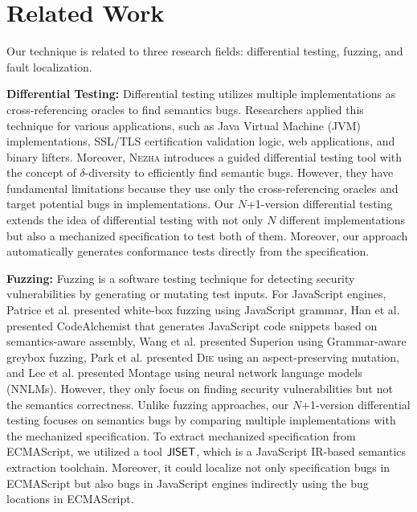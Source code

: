 \section{Related Work}\label{sec:related}

Our technique is related to three research fields: differential testing,
fuzzing, and fault localization.

\textbf{Differential Testing:} Differential testing\cite{diff-test} utilizes
multiple implementations as cross-referencing oracles to find semantics bugs.
Researchers applied this technique for various applications, such as Java
Virtual Machine (JVM) implementations\cite{diff-jvm}, SSL/TLS certification
validation logic\cite{nezha,diff-ssl,diff-ssl2}, web
applications\cite{diff-web}, and binary lifters\cite{ir-diff-test}.  Moreover,
\textsc{Nezha}\cite{nezha} introduces a guided differential testing tool with
the concept of $\delta$-diversity to efficiently find semantic bugs.  However,
they have fundamental limitations because they use only the cross-referencing
oracles and target potential bugs in implementations.  Our $N$+1-version differential
testing extends the idea of differential testing with not only $N$ different
implementations but also a mechanized specification to test both of them.
Moreover, our approach automatically generates conformance tests directly from
the specification.

\textbf{Fuzzing:} Fuzzing is a software testing technique for detecting
security vulnerabilities by generating\cite{imf,gen-fuzzing,csmith} or
mutating\cite{mutate-fuzzing,mutate-fuzzing2,mutate-fuzzing3} test inputs.  For
JavaScript\cite{js-hopl} engines, Patrice et al.\cite{grammar-whitebox}
presented white-box fuzzing using JavaScript grammar, Han et
al.\cite{codealchemist} presented CodeAlchemist that generates JavaScript code
snippets based on semantics-aware assembly, Wang et al.\cite{superion}
presented Superion using Grammar-aware greybox fuzzing, Park et al.\cite{die}
presented \textsc{Die} using an aspect-preserving mutation, and Lee et
al.\cite{montage} presented Montage using neural network language models
(NNLMs).  However, they only focus on finding security vulnerabilities but not
the semantics correctness. Unlike fuzzing approaches, our $N$+1-version differential
testing focuses on semantics bugs by comparing multiple implementations with
the mechanized specification.  To extract mechanized specification from
ECMAScript, we utilized a tool $\text{\sf JISET}$, which is a JavaScript IR-based
semantics extraction toolchain.  Moreover, it could localize not only
specification bugs in ECMAScript but also bugs in JavaScript engines indirectly
using the bug locations in ECMAScript.

